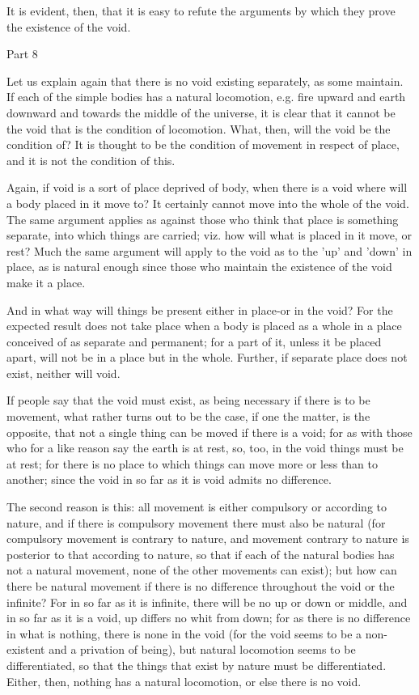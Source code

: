 It is evident, then, that it is easy to refute the arguments by which
they prove the existence of the void. 

Part 8

Let us explain again that there is no void existing separately, as
some maintain. If each of the simple bodies has a natural locomotion,
e.g. fire upward and earth downward and towards the middle of the
universe, it is clear that it cannot be the void that is the condition
of locomotion. What, then, will the void be the condition of? It is
thought to be the condition of movement in respect of place, and it
is not the condition of this. 

Again, if void is a sort of place deprived of body, when there is
a void where will a body placed in it move to? It certainly cannot
move into the whole of the void. The same argument applies as against
those who think that place is something separate, into which things
are carried; viz. how will what is placed in it move, or rest? Much
the same argument will apply to the void as to the 'up' and 'down'
in place, as is natural enough since those who maintain the existence
of the void make it a place. 

And in what way will things be present either in place-or in the void?
For the expected result does not take place when a body is placed
as a whole in a place conceived of as separate and permanent; for
a part of it, unless it be placed apart, will not be in a place but
in the whole. Further, if separate place does not exist, neither will
void. 

If people say that the void must exist, as being necessary if there
is to be movement, what rather turns out to be the case, if one the
matter, is the opposite, that not a single thing can be moved if there
is a void; for as with those who for a like reason say the earth is
at rest, so, too, in the void things must be at rest; for there is
no place to which things can move more or less than to another; since
the void in so far as it is void admits no difference. 

The second reason is this: all movement is either compulsory or according
to nature, and if there is compulsory movement there must also be
natural (for compulsory movement is contrary to nature, and movement
contrary to nature is posterior to that according to nature, so that
if each of the natural bodies has not a natural movement, none of
the other movements can exist); but how can there be natural movement
if there is no difference throughout the void or the infinite? For
in so far as it is infinite, there will be no up or down or middle,
and in so far as it is a void, up differs no whit from down; for as
there is no difference in what is nothing, there is none in the void
(for the void seems to be a non-existent and a privation of being),
but natural locomotion seems to be differentiated, so that the things
that exist by nature must be differentiated. Either, then, nothing
has a natural locomotion, or else there is no void. 

